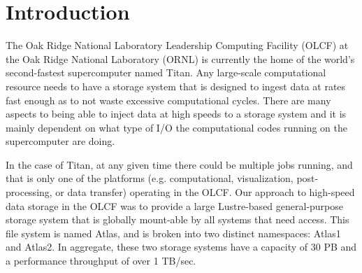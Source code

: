 \documentclass[conference,compsoc]{IEEEtran}
\begin{document}
%
\IEEEpeerreviewmaketitle


\section{Introduction}

The Oak Ridge National Laboratory Leadership Computing Facility (OLCF) at the
Oak Ridge National Laboratory (ORNL) is currently the home of the world's
second-fastest supercomputer named Titan. Any large-scale computational
resource needs to have a storage system that is designed to ingest data at
rates fast enough as to not waste excessive computational cycles. There are
many aspects to being able to inject data at high speeds to a storage system
and it is mainly dependent on what type of I/O the computational codes running
on the supercomputer are doing. 

In the case of Titan, at any given time there could be multiple jobs running,
and that is only one of the platforms (e.g. computational, visualization,
post-processing, or data transfer) operating in the OLCF. Our approach to
high-speed data storage in the OLCF was to provide a large Lustre-based
general-purpose storage system that is globally mount-able by all systems that
need access. This file system is named Atlas, and is broken into two distinct
namespaces: Atlas1 and Atlas2. In aggregate, these two storage systems have a
capacity of 30 PB and a performance throughput of over 1 TB/sec. 
\end{document}
